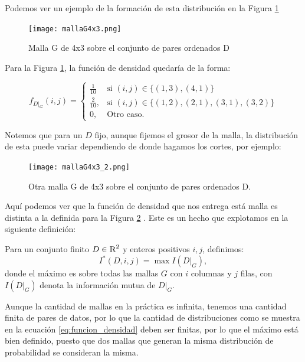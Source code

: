          Podemos ver un ejemplo de la formaci\'on de esta distribuci\'on en la Figura \ref{mallaG}

        \begin{figure}[H]
            \centering
            \texttt{[image: mallaG4x3.png]}
            \caption{Malla G de 4x3 sobre el conjunto de pares ordenados D}
            \label{mallaG}
        \end{figure}
    
        Para la Figura \ref{mallaG}, la funci\'on de densidad quedar\'ia de la forma:

        \begin{equation}
            \label{eq:funcion_densidad}
            f_{D|_G}(i,j) = \left\{\begin{array}{lr}
                \frac{1}{10} & \text{si } (i,j) \in \{ (1,3), (4,1)\} \\
                \frac{2}{10}, & \text{si }(i,j) \in \{ (1,2), (2,1), (3,1),(3,2)\}  \\
                0, & \text{Otro caso.}
                \end{array}\right.
        \end{equation}
    
    
        Notemos que para un $D$ fijo, aunque fijemos el grosor de la malla, la distribuci\'on de esta puede variar dependiendo de donde hagamos los cortes, por ejemplo:
    
        \begin{figure}[H] 
            \centering
            \texttt{[image: mallaG4x3\_2.png]}
            \caption{Otra malla G de 4x3 sobre el conjunto de pares ordenados D.}
            \label{malla_G_2}
        \end{figure}
    
        Aqu\'i podemos ver que la funci\'on de densidad que nos entrega est\'a malla es distinta a la definida para la Figura \ref{malla_G_2} . Este es un hecho que explotamos en la siguiente definici\'on: 
    
        \begin{defn}
            Para un conjunto finito $D\in\textsc{R}^2$ y enteros positivos $i,j$, definimos:
            $$
            I^*(D,i,j)=\max I(D|_G),
            $$
            donde el m\'aximo es sobre todas las mallas $G$ con $i$ columnas y $j$ filas, con $I(D|_G)$ denota la informaci\'on mutua de $D|_G$.
        \end{defn}
    
        \begin{rem}
            Aunque la cantidad de mallas en la pr\'actica es infinita, tenemos una cantidad finita de pares de datos, por lo que la cantidad de distribuciones como se muestra en la ecuaci\'on \ref{eq:funcion_densidad} deben ser finitas, por lo que el m\'aximo est\'a bien definido, puesto que dos mallas que generan la misma distribuci\'on de probabilidad se consideran la misma.
        \end{rem}

